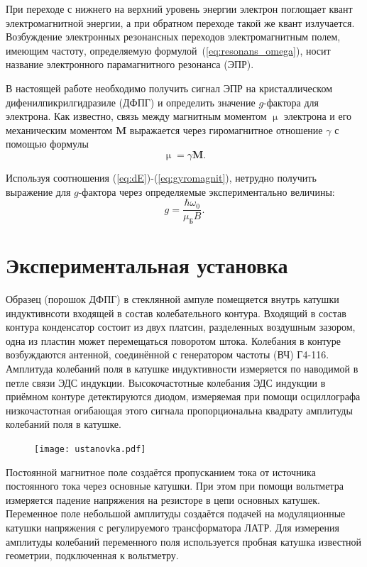 \documentclass[a4paper,12pt]{article} %
\begin{document}
	При переходе с нижнего на верхний уровень энергии электрон поглощает квант электромагнитной энергии, а при обратном переходе такой же квант излучается. Возбуждение электронных резонансных переходов электромагнитным полем, имеющим частоту, определяемую формулой~(\ref{eq:resonans_omega}), носит название электронного парамагнитного резонанса (ЭПР).
	
	В настоящей работе необходимо получить сигнал ЭПР на кристаллическом дифенилпикрилгидразиле (ДФПГ) и определить значение $g$-фактора для электрона. Как известно, связь между магнитным моментом $\upmu$ электрона и его механическим моментом $\mathbf{M}$ выражается через гиромагнитное отношение $\gamma$ с помощью формулы
	\begin{equation}
		\label{eq:gyromagnit}
		\upmu = \gamma \mathbf{M}.
	\end{equation}

	Используя соотношения (\ref{eq:dE})-(\ref{eq:gyromagnit}), нетрудно получить выражение для $g$-фактора через определяемые экспериментально величины:
	\begin{equation}
		\label{eq:g-faktor}
		\tag{$\star$}
		g = \frac{\hbar \omega_0}{\mu_\text{Б}B}.
	\end{equation}

\newpage
\section{Экспериментальная установка}
	Образец (порошок ДФПГ) в стеклянной ампуле помещяется внутрь катушки индуктивнсоти входящей в состав колебательного контура. Входящий в состав контура конденсатор состоит из двух платсин, разделенных воздушным зазором, одна из пластин может перемещаться поворотом штока. Колебания в контуре возбуждаются антенной, соединённой с генератором частоты (ВЧ) Г4-116. Амплитуда колебаний поля в катушке индуктивности измеряется по наводимой в петле связи ЭДС индукции. Высокочастотные колебания ЭДС индукции в приёмном контуре детектируются диодом, измеряемая при помощи осциллографа низкочастотная огибающая этого сигнала пропорциональна квадрату амплитуды колебаний поля в катушке.
	\begin{figure}[h!]
		\begin{floatrow}
			{\texttt{[image: ustanovka.pdf]}}    
		\end{floatrow}
	\end{figure}
	
	Постоянной магнитное поле создаётся пропусканием тока от источника постоянного тока через основные катушки. При этом при помощи вольтметра измеряется падение напряжения на резисторе в цепи основных катушек. Переменное поле небольшой амплитуды создаётся подачей на модуляционные катушки напряжения с регулируемого трансформатора ЛАТР. Для измерения амплитуды колебаний переменного поля используется пробная катушка известной геометрии, подключенная к вольтметру.
	
\end{document}
